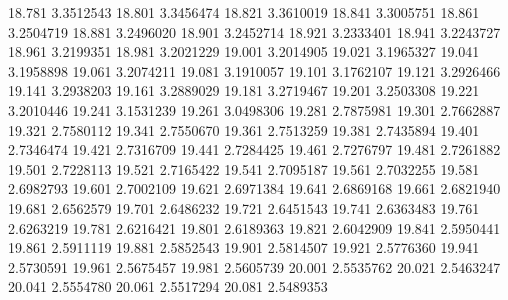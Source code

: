 18.781 3.3512543
18.801 3.3456474
18.821 3.3610019
18.841 3.3005751
18.861 3.2504719
18.881 3.2496020
18.901 3.2452714
18.921 3.2333401
18.941 3.2243727
18.961 3.2199351
18.981 3.2021229
19.001 3.2014905
19.021 3.1965327
19.041 3.1958898
19.061 3.2074211
19.081 3.1910057
19.101 3.1762107
19.121 3.2926466
19.141 3.2938203
19.161 3.2889029
19.181 3.2719467
19.201 3.2503308
19.221 3.2010446
19.241 3.1531239
19.261 3.0498306
19.281 2.7875981
19.301 2.7662887
19.321 2.7580112
19.341 2.7550670
19.361 2.7513259
19.381 2.7435894
19.401 2.7346474
19.421 2.7316709
19.441 2.7284425
19.461 2.7276797
19.481 2.7261882
19.501 2.7228113
19.521 2.7165422
19.541 2.7095187
19.561 2.7032255
19.581 2.6982793
19.601 2.7002109
19.621 2.6971384
19.641 2.6869168
19.661 2.6821940
19.681 2.6562579
19.701 2.6486232
19.721 2.6451543
19.741 2.6363483
19.761 2.6263219
19.781 2.6216421
19.801 2.6189363
19.821 2.6042909
19.841 2.5950441
19.861 2.5911119
19.881 2.5852543
19.901 2.5814507
19.921 2.5776360
19.941 2.5730591
19.961 2.5675457
19.981 2.5605739
20.001 2.5535762
20.021 2.5463247
20.041 2.5554780
20.061 2.5517294
20.081 2.5489353

